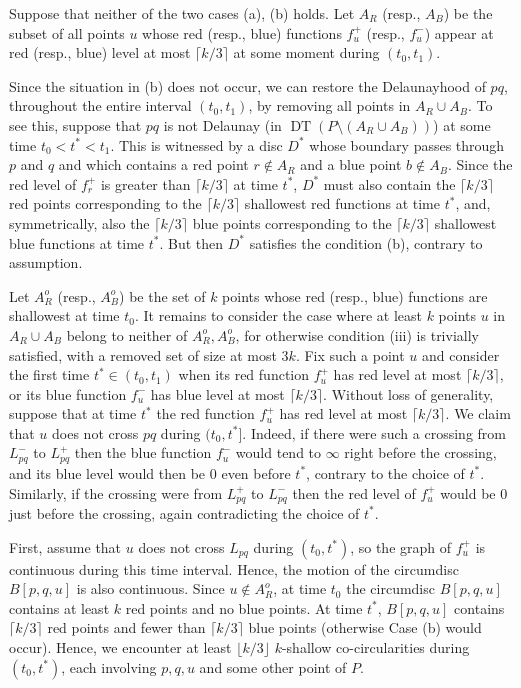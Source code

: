 \documentclass[letter,11pt]{article}
\def \L{{L}}
\def\DT{\mathop{\mathrm{DT}}}
\begin{document}
\smallskip
{} Suppose that neither of the two cases (a), (b) holds. 
Let $A_R$ (resp., $A_B$) be the subset of all points $u$ whose red (resp., blue) functions $f_u^+$ (resp., $f^-_u$) appear at red (resp., blue) level at most $\lceil k/3 \rceil$ at some moment during $(t_0,t_1)$. 

Since the situation in (b) does not occur, we can restore the Delaunayhood of $pq$, throughout the entire interval $(t_0,t_1)$, by removing all points in $A_R\cup A_B$. To see this, suppose that $pq$ is not Delaunay (in $\DT(P\setminus (A_R\cup A_B))$) at some time $t_0< t^*< t_1$. This is witnessed by a disc $D^*$ whose boundary passes through $p$ and $q$ and which contains a red point $r\not\in A_R$ and a blue point $b\not\in A_B$. Since the red level of $f_r^+$ is greater than $\lceil k/3\rceil$ at time $t^*$, $D^*$ must also contain the $\lceil k/3\rceil$ red points corresponding to the $\lceil k/3\rceil$ shallowest red functions at time $t^*$, and, symmetrically, also the $\lceil k/3\rceil$ blue points corresponding to the $\lceil k/3 \rceil$ shallowest blue functions at time $t^*$. But then $D^*$ satisfies the condition (b), contrary to assumption. 



Let $A_R^o$ (resp., $A_B^o$) be the set of $k$ points whose red (resp., blue) functions are shallowest at time $t_0$.
It remains to consider the case where at least $k$ points $u$ in $A_R\cup A_B$ belong to neither of $A_R^o,A_B^o$, for otherwise condition (iii) is trivially satisfied, with a removed set of size at most $3k$.
Fix such a point $u$ and consider the first time $t^*\in (t_0,t_1)$ when its red function $f_u^+$ has red level at most $\lceil k/3\rceil$, or its blue function $f_u^-$ has blue level at most $\lceil k/3\rceil$. Without loss of generality, suppose that at time $t^*$ the red function $f_u^+$ has red level at most $\lceil k/3\rceil$.
We claim that $u$ does not cross $pq$ during $(t_0,t^*]$. Indeed, if there were such a crossing from $\L_{pq}^-$ to $\L_{pq}^+$ then the blue function $f_u^-$ would tend to $\infty$ right before the crossing, and its blue level would then be $0$ even before $t^*$, contrary to the choice of $t^*$. Similarly, if the crossing were from $\L_{pq}^+$ to $\L_{pq}^-$ then the red level of $f_u^+$ would be $0$ just before the crossing, again contradicting the choice of $t^*$. 

First, assume that $u$ does not cross $\L_{pq}$ during $(t_0,t^*)$, so the graph of $f_u^+$ is continuous during this time interval. Hence, the motion of the circumdisc $B[p,q,u]$ is also continuous.
Since $u\not\in A_R^o$, at time $t_0$ the circumdisc $B[p,q,u]$ contains at least $k$ red points and no blue points. At time $t^*$,
$B[p,q,u]$ contains $\lceil k/3\rceil$ red points and fewer than $\lceil k/3\rceil$ blue points (otherwise Case (b) would occur). 
Hence, we encounter at least $\lfloor k/3\rfloor$ $k$-shallow co-circularities during $(t_0,t^*)$, each involving $p,q,u$ and some other point of $P$.
\end{document}
